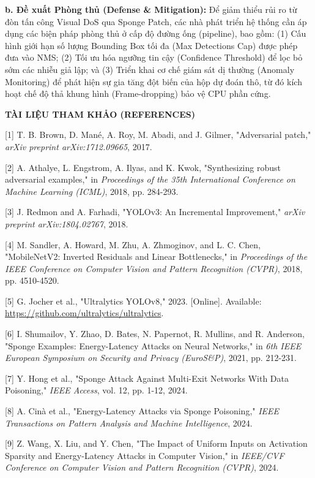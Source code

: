 \textbf{b. Đề xuất Phòng thủ (Defense \& Mitigation):} Để giảm thiểu rủi
ro từ đòn tấn công Visual DoS qua Sponge Patch, các nhà phát triển hệ
thống cần áp dụng các biện pháp phòng thủ ở cấp độ đường ống (pipeline),
bao gồm: (1) Cấu hình giới hạn số lượng Bounding Box tối đa (Max
Detections Cap) được phép đưa vào NMS; (2) Tối ưu hóa ngưỡng tin cậy
(Confidence Threshold) để lọc bỏ sớm các nhiễu giả lập; và (3) Triển
khai cơ chế giám sát dị thường (Anomaly Monitoring) để phát hiện sự gia
tăng đột biến của hộp dự đoán thô, từ đó kích hoạt chế độ thả khung hình
(Frame-dropping) bảo vệ CPU phần cứng.

\textbf{\hfill\break
TÀI LIỆU THAM KHẢO (REFERENCES)}

{[}1{]} T. B. Brown, D. Mané, A. Roy, M. Abadi, and J. Gilmer,
"Adversarial patch," \emph{arXiv preprint arXiv:1712.09665}, 2017.

{[}2{]} A. Athalye, L. Engstrom, A. Ilyas, and K. Kwok, "Synthesizing
robust adversarial examples," in \emph{Proceedings of the 35th
International Conference on Machine Learning (ICML)}, 2018, pp. 284-293.

{[}3{]} J. Redmon and A. Farhadi, "YOLOv3: An Incremental Improvement,"
\emph{arXiv preprint arXiv:1804.02767}, 2018.

{[}4{]} M. Sandler, A. Howard, M. Zhu, A. Zhmoginov, and L. C. Chen,
"MobileNetV2: Inverted Residuals and Linear Bottlenecks," in
\emph{Proceedings of the IEEE Conference on Computer Vision and Pattern
Recognition (CVPR)}, 2018, pp. 4510-4520.

{[}5{]} G. Jocher et al., "Ultralytics YOLOv8," 2023. {[}Online{]}.
Available: \url{https://github.com/ultralytics/ultralytics}.

{[}6{]} I. Shumailov, Y. Zhao, D. Bates, N. Papernot, R. Mullins, and R.
Anderson, "Sponge Examples: Energy-Latency Attacks on Neural Networks,"
in \emph{6th IEEE European Symposium on Security and Privacy
(EuroS\&P)}, 2021, pp. 212-231.

{[}7{]} Y. Hong et al., "Sponge Attack Against Multi-Exit Networks With
Data Poisoning," \emph{IEEE Access}, vol. 12, pp. 1-12, 2024.

{[}8{]} A. Cinà et al., "Energy-Latency Attacks via Sponge Poisoning,"
\emph{IEEE Transactions on Pattern Analysis and Machine Intelligence},
2024.

{[}9{]} Z. Wang, X. Liu, and Y. Chen, "The Impact of Uniform Inputs on
Activation Sparsity and Energy-Latency Attacks in Computer Vision," in
\emph{IEEE/CVF Conference on Computer Vision and Pattern Recognition
(CVPR)}, 2024.

